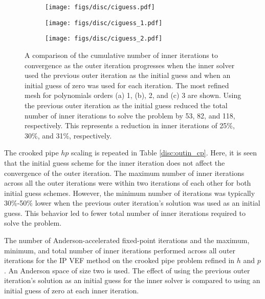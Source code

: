 \documentclass[../doc.tex]{subfiles}
\begin{document}
\begin{figure}
\centering 
\begin{subfigure}{.32\textwidth}
	\centering
	\texttt{[image: figs/disc/ciguess.pdf]}
	\caption{}
\end{subfigure}
\begin{subfigure}{.32\textwidth}
	\centering
	\texttt{[image: figs/disc/ciguess\_1.pdf]}
	\caption{}
\end{subfigure}
\begin{subfigure}{.32\textwidth}
	\centering
	\texttt{[image: figs/disc/ciguess\_2.pdf]}
	\caption{}
\end{subfigure}
\caption{A comparison of the cumulative number of inner iterations to convergence as the outer iteration progresses when the inner solver used the previous outer iteration as the initial guess and when an initial guess of zero was used for each iteration. The most refined mesh for polynomials orders (a) 1, (b), 2, and (c) 3 are shown. Using the previous outer iteration as the initial guess reduced the total number of inner iterations to solve the problem by 53, 82, and 118, respectively. This represents a reduction in inner iterations of 25\%, 30\%, and 31\%, respectively.}
\label{disc:ciguess}
\end{figure}

The crooked pipe $hp$ scaling is repeated in Table \ref{disc:outin_cp}. Here, it is seen that the initial guess scheme for the inner iteration does not affect the convergence of the outer iteration. The maximum number of inner iterations across all the outer iterations were within two iterations of each other for both initial guess schemes. However, the minimum number of iterations was typically 30\%-50\% lower when the previous outer iteration's solution was used as an initial guess. This behavior led to fewer total number of inner iterations required to solve the problem.   

\begin{table}
\centering
\caption{The number of Anderson-accelerated fixed-point iterations and the maximum, minimum, and total number of inner iterations performed across all outer iterations for the IP VEF method on the crooked pipe problem refined in $h$ and $p$. An Anderson space of size two is used. The effect of using the previous outer iteration's solution as an initial guess for the inner solver is compared to using an initial guess of zero at each inner iteration. }
\label{disc:outin_cp}

\end{table}
\end{document}
